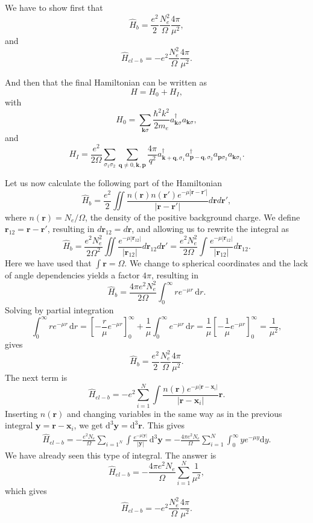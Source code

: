 \documentclass[%
oneside,                 %
final,                   %
10pt]{article}
\newenvironment{doconceexercise}{}{}
\begin{document}
\begin{doconceexercise}
We have to show first  that
\[
\hat{H}_{b}=\frac{e^2}{2}\frac{N_e^2}{\Omega}\frac{4\pi}{\mu^2},
\]
and
\[
\hat{H}_{el-b}=-e^2\frac{N_e^2}{\Omega}\frac{4\pi}{\mu^2}.
\]


And then that the final Hamiltonian can be written as 
\[
H=H_{0}+H_{I},
\]
with
\[
H_{0}={\displaystyle\sum_{\mathbf{k}\sigma}}
\frac{\hbar^{2}k^{2}}{2m_e}a_{\mathbf{k}\sigma}^{\dagger}
a_{\mathbf{k}\sigma},
\]
and
\[
H_{I}=\frac{e^{2}}{2\Omega}{\displaystyle\sum_{\sigma_{1}
\sigma_{2}}}{\displaystyle
\sum_{\mathbf{q}\neq 0,\mathbf{k},\mathbf{p}}}\frac{4\pi}{q^{2}}
a_{\mathbf{k}+\mathbf{q},\sigma_{1}}^{\dagger}
a_{\mathbf{p}-\mathbf{q},\sigma_{2}}^{\dagger}
a_{\mathbf{p}\sigma_{2}}a_{\mathbf{k}\sigma_{1}}.
\] 

Let us now calculate the following part of the Hamiltonian
\[ \hat H_b = \frac{e^2}{2} \iint \frac{n(\mathbf{r}) n(\mathbf{r}')e^{-\mu|\mathbf{r} - \mathbf{r}'|}}{|\mathbf{r} - \mathbf{r}'|} d\mathbf{r} d\mathbf{r}' , 
\]
where $n(\mathbf{r}) = N_e/\Omega$, the density of the positive background charge. We define $\mathbf{r}_{12} = \mathbf{r} - \mathbf{r}'$, resulting in $d\mathbf{r}_{12} = d\mathbf{r}$, and allowing us to rewrite the integral as
\[ 
\hat H_b = \frac{e^2 N_e^2}{2\Omega^2} \iint \frac{e^{-\mu |\mathbf{r}_{12}|}}{|\mathbf{r}_{12}|} d\mathbf{r}_{12} d\mathbf{r}' = \frac{e^2 N_e^2}{2\Omega} \int \frac{e^{-\mu |\mathbf{r}_{12}|}}{|\mathbf{r}_{12}|} d\mathbf{r}_{12} . 
\]
Here we have used that $\int \! \mathbf{r} = \Omega$. We change to spherical coordinates and the lack of angle 
dependencies yields a factor $4\pi$, resulting in
\[ 
\hat H_b = \frac{4\pi e^2 N_e^2}{2\Omega} \int_0^\infty re^{-\mu r} \, \mathrm{d} r . 
\]
Solving by partial integration
\[ \int_0^\infty re^{-\mu r} \, \mathrm{d} r = \left[ -\frac{r}{\mu} e^{-\mu r} \right]_0^\infty + \frac{1}{\mu} \int_0^\infty e^{-\mu r} \, \mathrm{d} r
= \frac{1}{\mu} \left[ - \frac{1}{\mu} e^{-\mu r} \right]_0^\infty = \frac{1}{\mu^2}, 
\]
gives
\[
\hat{H}_b = \frac{e^2}{2} \frac{N_e^2}{\Omega} \frac{4\pi}{\mu^2} .
\]
The next term is 
\[ 
\hat H_{el-b} = -e^2 \sum_{i = 1}^N \int \frac{n(\mathbf{r}) e^{-\mu |\mathbf{r} - \mathbf{x}_i|}}{|\mathbf{r} - \mathbf{x}_i|} \mathbf{r} . 
\]
Inserting  $n(\mathbf{r})$ and changing variables in the same way as in the previous integral $\mathbf{y} = \mathbf{r} - \mathbf{x}_i$, we get $\mathrm{d}^3 \mathbf{y} = \mathrm{d}^3 \mathbf{r}$. This gives
\begin{align}
\hat H_{el-b} = -\frac{e^2 N_e}{\Omega} \sum_{i = 1^N} \int \frac{e^{-\mu |\mathbf{y}|}}{|\mathbf{y}|} \, \mathrm{d}^3 \mathbf{y}
=  -\frac{4\pi e^2 N_e}{\Omega} \sum_{i = 1}^N \int_0^\infty y e^{-\mu y} \mathrm{d} y. 
\end{align}
We have already seen this  type of integral. The answer is 
\[ 
\hat H_{el-b} = -\frac{4\pi e^2 N_e}{\Omega} \sum_{i = 1}^N \frac{1}{\mu^2}, 
\]
which gives
\[
\hat H_{el-b} = -e^2 \frac{N_e^2}{\Omega} \frac{4\pi}{\mu^2} .
\]


\end{doconceexercise}
\end{document}
